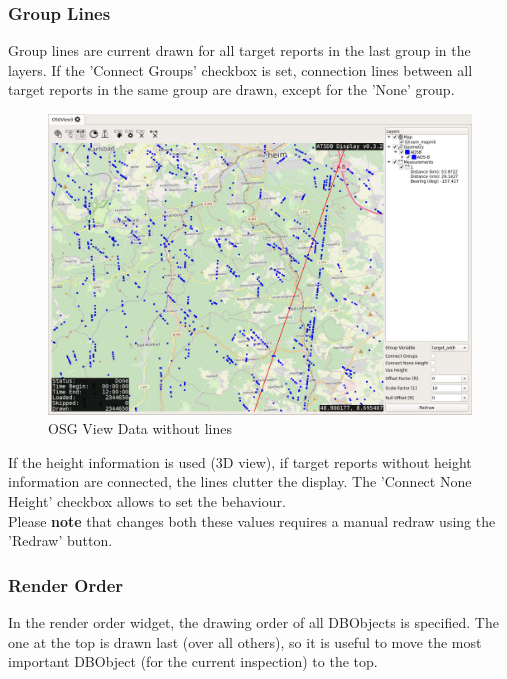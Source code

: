 \subsubsection{Group Lines}

Group lines are current drawn for all target reports in the last group in the layers. If the 'Connect Groups' checkbox is set, connection lines between all target reports in the same group are drawn, except for the 'None' group.

\begin{figure}[H]
    \hspace*{-2cm}
    \includegraphics[width=18cm,frame]{../screenshots/osgview_no_lines.png}
  \caption{OSG View Data without lines}
\end{figure}

If the height information is used (3D view), if target reports without height information are connected, the lines clutter the display. The 'Connect None Height' checkbox allows to set the behaviour. \\

Please \textbf{note} that changes both these values requires a manual redraw using the 'Redraw' button.

\subsubsection{Render Order}

In the render order widget, the drawing order of all DBObjects is specified. The one at the top is drawn last (over all others), so it is useful to move the most important DBObject (for the current inspection) to the top.

